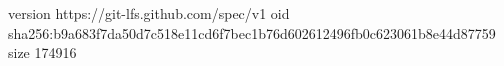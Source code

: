 version https://git-lfs.github.com/spec/v1
oid sha256:b9a683f7da50d7c518e11cd6f7bec1b76d602612496fb0c623061b8e44d87759
size 174916
